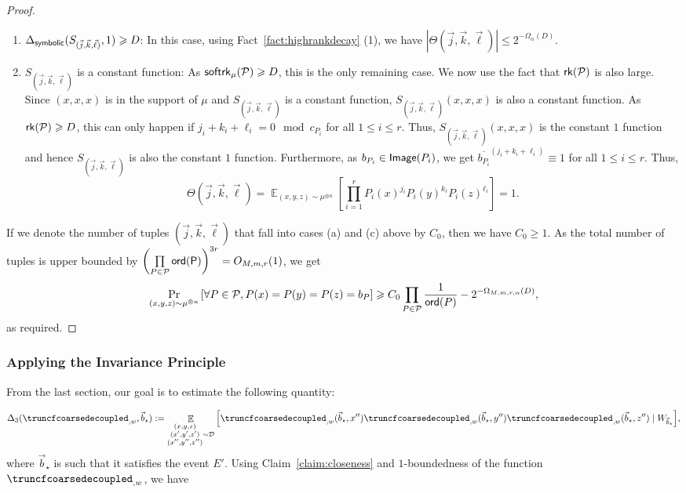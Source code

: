 \documentclass[11pt]{article}
\newcommand\card[1]{\left| {#1} \right|}
\newcommand\Prob[2]{{\Pr_{#1}\left[ {#2} \right]}}
\newcommand\Expect[2]{{\mathop{\mathbb{E}}_{#1}\left[ {#2} \right]}}
\renewcommand\geq{\geqslant}
\renewcommand\leq{\leqslant}
\newcommand{\V}[1]{{#1}}
\begin{document}
{\begin{proof}
\begin{enumerate}
         \item[(b)] $\Delta_{{\sf symbolic}}(S_{(\vec{j}, \vec{k}, \vec{\ell})},1)\geq D$: In this case, using Fact~\ref{fact:highrankdecay} (1), we have $\card{\Theta(\vec{j}, \vec{k}, \vec{\ell})} \leq 2^{-\Omega_{\alpha}(D)}$.
         
        \item[(c)]  $S_{(\vec{j}, \vec{k}, \vec{\ell})}$ is a constant function: As ${\sf softrk}_{\mu}(\mathcal{P})\geq D$, this is the only remaining case. We now use the fact that ${\sf rk}(\mathcal{P})$ is also large. Since $(x, x, x)$ is in the support of $\mu$ and $S_{(\vec{j}, \vec{k}, \vec{\ell})}$ is a constant function, $S_{(\vec{j}, \vec{k}, \vec{\ell})}(x, x, x)$ is also a constant function. As ${\sf rk}(\mathcal{P})\geq D$, this can only happen if $j_i+k_i+\ell_i = 0 \mod c_{P_{i}}$ for all $1\leq i\leq r$. Thus, $S_{(\vec{j}, \vec{k}, \vec{\ell})}(x, x, x)$ is the constant $1$ function and hence $S_{(\vec{j}, \vec{k}, \vec{\ell})}$ is also the constant $1$ function. Furthermore, as $b_{P_i}\in {\sf Image}(P_i)$, we get $\overline{b_{P_i}}^{(j_i +k_i+\ell_i)}\equiv 1$ for all $1\leq i\leq r$. Thus, 
         $$\Theta(\vec{j}, \vec{k}, \vec{\ell}) =  \Expect{(x,y,z)\sim\mu^{\otimes n}}{\prod_{i=1}^r P_i(x)^{j_i} P_i(y)^{k_i} P_i(z)^{\ell_i}} = 1.$$
     \end{enumerate}
     If we denote the number of tuples $(\vec{j}, \vec{k}, \vec{\ell})$ that fall into cases (a) and (c) above by $C_0$, then we have $C_0\geq 1$. As the total number of tuples is upper bounded by $\left(\prod\limits_{P\in\mathcal{P}} {\sf ord (P)}\right)^{3r} = O_{M, m, r}(1)$, we get 
       \begin{align*}
          \Prob{(x,y,z)\sim\mu^{\otimes n}}{\forall P\in \mathcal{P}, P(x)=P(y)=P(z) = b_P}  \geq C_0\prod\limits_{P\in\mathcal{P}}\frac{1}{{\sf ord}(P)}-2^{-\Omega_{M,m,r,\alpha}(D)},
      \end{align*}
      as required.
    \end{proof}

}\fi


\subsubsection{Applying the Invariance Principle}
\label{sec:apply_invariance_stuff}

From the last section, our goal is to estimate the following quantity:

$$\Delta_3(\truncfcoarsedecoupled_{, \V w}, \vec{b}_\star) := \Expect{\substack{(\V x, \V y, \V z)\\(\V x', \V y', \V z')\\ (\V x'', \V y'', \V z'')}\sim \mathcal{D}}{\truncfcoarsedecoupled_{,\V w}(\vec{b}_\star, \V x'') \truncfcoarsedecoupled_{,\V w}(\vec{b}_\star, \V y'') \truncfcoarsedecoupled_{,\V w}(\vec{b}_\star, \V z'')  \mid W_{\vec{b}_\star}},$$
where $\vec{b}_\star$ is such that it satisfies the event $E'$. Using Claim~\ref{claim:closeness} and $1$-boundedness of the function $\truncfcoarsedecoupled_{,\V w}$, we have
\end{document}
